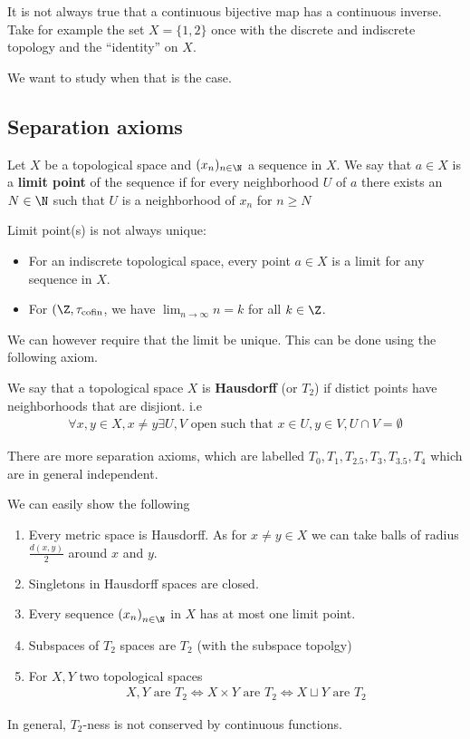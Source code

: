 It is not always true that a continuous bijective map has a continuous inverse.
Take for example the set $X= \{1,2\}$ once with the discrete and indiscrete topology and the ``identity'' on $X$.

We want to study when that is the case.


\subsection{Separation axioms}

\begin{dfn}[]
  Let $X$ be a topological space and $(x_n)_{n \in \N}$ a sequence in $X$.
  We say that $a \in X$ is a \textbf{limit point} of the sequence if for every neighborhood $U$ of $a$ there exists an $N \in \N$ such that $U$ is a neighborhood of $x_n$ for $n \geq N$
\end{dfn}
\begin{ex}[]
  Limit point(s) is not always unique:
\begin{itemize}
  \item For an indiscrete topological space, every point $a \in X$ is a limit for any sequence in $X$.
  \item For $(\Z,\tau_{\text{cofin}}$, we have $\lim_{n \to \infty}n = k$ for all $k \in \Z$.
\end{itemize}
\end{ex}

We can however require that the limit be unique. This can be done using the following axiom.

\begin{dfn}[]
  We say that a topological space $X$ is \textbf{Hausdorff} (or $T_2$) if distict points have neighborhoods that are disjiont. i.e
  \begin{align*}
    \forall x,y \in X, x \neq y \exists U,V \text{ open such that } x \in U, y \in V, U \cap V = \emptyset
  \end{align*}
\end{dfn}
There are more separation axioms, which are labelled $T_0,T_1,T_{2.5},T_3,T_{3.5},T_4$ which are in general independent.
\begin{rem}[]
  We can easily show the following
\begin{enumerate}
  \item Every metric space is Hausdorff. As for $x \neq y \in X$ we can take balls of radius $\frac{d(x,y)}{2}$ around $x$ and $y$.
  \item Singletons in Hausdorff spaces are closed.
  \item Every sequence $\left(x_{n}\right)_{n \in \N}$ in $X$ has at most one limit point.
  \item Subspaces of $T_2$ spaces are $T_2$ (with the subspace topolgy)
  \item For $X,Y$ two topological spaces
    \begin{align*}
      X,Y \text{ are } T_2 \iff X \times Y \text{ are }T_2 \iff X \sqcup Y \text{ are }T_2
    \end{align*}
\end{enumerate}
\end{rem}
In general, $T_2$-ness is not conserved by continuous functions.

